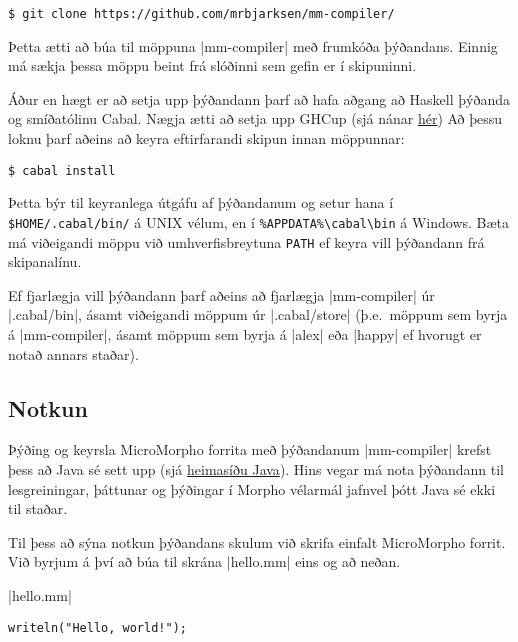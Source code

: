 \documentclass[12pt]{article}
\begin{document}
\begin{mdframed}[style=langframe]
\begin{Verbatim}
$ git clone https://github.com/mrbjarksen/mm-compiler/
\end{Verbatim}
\end{mdframed}

Þetta ætti að búa til möppuna |mm-compiler| með frumkóða þýðandans.
Einnig má sækja þessa möppu beint frá slóðinni sem gefin er í skipuninni.

Áður en hægt er að setja upp þýðandann þarf að hafa aðgang að Haskell þýðanda
og smíðatólinu Cabal. Nægja ætti að setja upp GHCup
(sjá nánar \href{https://www.haskell.org/ghcup/install/}{hér})
Að þessu loknu þarf aðeins að keyra eftirfarandi skipun innan möppunnar:

\begin{mdframed}[style=langframe]
\begin{Verbatim}
$ cabal install
\end{Verbatim}
\end{mdframed}

Þetta býr til keyranlega útgáfu af þýðandanum
og setur hana í \verb|$HOME/.cabal/bin/| á UNIX vélum,
en í \verb|%APPDATA%\cabal\bin| á Windows.
Bæta má viðeigandi möppu við umhverfisbreytuna \verb|PATH|
ef keyra vill þýðandann frá skipanalínu.

Ef fjarlægja vill þýðandann þarf aðeins að fjarlægja |mm-compiler| úr
|.cabal/bin|, ásamt viðeigandi möppum úr |.cabal/store|
(þ.e.~möppum sem byrja á |mm-compiler|, ásamt möppum sem byrja á |alex|
eða |happy| ef hvorugt er notað annars staðar).

\subsection{Notkun}
Þýðing og keyrsla MicroMorpho forrita með þýðandanum |mm-compiler|
krefst þess að Java sé sett upp (sjá \href{https://www.java.com/en/}{heimasíðu Java}).
Hins vegar má nota þýðandann til lesgreiningar, þáttunar
og þýðingar í Morpho vélarmál jafnvel þótt Java sé ekki til staðar.

Til þess að sýna notkun þýðandans skulum við skrifa einfalt
MicroMorpho forrit.
Við byrjum á því að búa til skrána |hello.mm| eins og að neðan.
\medskip

\newpage

\colorbox{gray!75}{\hspace*{9pt}|hello.mm|\hspace{9pt}}\vspace{-10pt}\par%
\begin{mdframed}[style=langframe,topline=true]
\begin{Verbatim}
writeln("Hello, world!");
\end{Verbatim}
\end{mdframed}
\end{document}
